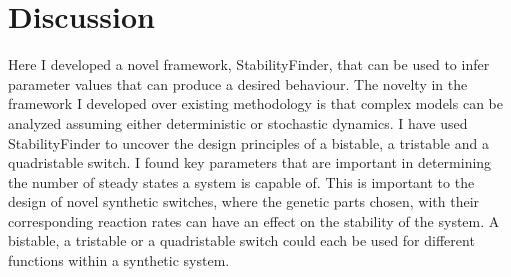 \clearpage


\section{Discussion}
  
 
 Here I developed a novel framework, StabilityFinder, that can be used to infer parameter values that can produce a desired behaviour. The novelty in the framework I developed over existing methodology is that complex models can be analyzed assuming either deterministic or stochastic dynamics. I have used StabilityFinder to uncover the design principles of a bistable, a tristable and a quadristable switch. I found key parameters that are important in determining the number of steady states a system is capable of. This is important to the design of novel synthetic switches, where the genetic parts chosen, with their corresponding reaction rates can have an effect on the stability of the system. A bistable, a tristable or a quadristable switch could each be used for different functions within a synthetic system. 
  
